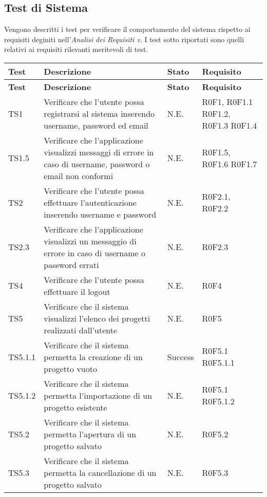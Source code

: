 \subsection{Test di Sistema}
Vengono descritti i test per verificare il comportamento del sistema rispetto ai requisiti deginiti nell'\emph{Analisi dei Requisiti v}\VersioneAR.
I test sotto riportati sono quelli relativi ai requisiti rilevanti meritevoli di test.
\begin{longtable}{p{2.5cm}!{\VRule[1pt]}p{6.5cm}!{\VRule[1pt]}p{1cm}!{\VRule[1pt]}p{3cm}}
\color{white} \textbf{Test} & \color{white} \textbf{Descrizione}  & \color{white} \textbf{Stato}  & \color{white} \textbf{Requisito}\\ 
\endfirsthead 
{} 
\color{white} \textbf{Test} & \color{white} \textbf{Descrizione}  & \color{white} \textbf{Stato}  & \color{white} \textbf{Requisito}\\  
\endhead 
TS1 & Verificare che l'utente possa registrarsi al sistema inserendo username, password ed email  & N.E. & R0F1, R0F1.1\newline
R0F1.2, R0F1.3\newline
R0F1.4\\
TS1.5 & Verificare che l'applicazione visualizzi messaggi di errore in caso di username, password o email non conformi & N.E. & R0F1.5, R0F1.6 \newline
R0F1.7\\
TS2 & Verificare che l'utente possa effettuare l'autenticazione inserendo username e password & N.E. & R0F2.1, R0F2.2\\
TS2.3 & Verificare che l'applicazione visualizzi un messaggio di errore in caso di username o password errati & N.E. & R0F2.3\\
TS4 & Verificare che l'utente possa effettuare il logout & N.E. & R0F4\\
TS5 & Verificare che il sistema visualizzi l'elenco dei progetti realizzati dall'utente & N.E. & R0F5 \\
TS5.1.1 & Verificare che il sistema permetta la creazione di un progetto vuoto & Success & R0F5.1 R0F5.1.1\\
TS5.1.2 & Verificare che il sistema permetta l'importazione di un progetto esistente & N.E. & R0F5.1 R0F5.1.2\\
TS5.2 & Verificare che il sistema permetta l'apertura di un progetto salvato & N.E. & R0F5.2\\
TS5.3 & Verificare che il sistema permetta la cancellazione di un progetto salvato & N.E. & R0F5.3\\

\end{longtable}
